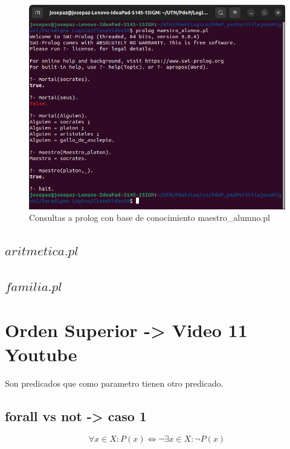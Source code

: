 \documentclass[11pt,a4paper]{article}
\begin{document}
\begin{figure}[H]
	\centering
	\includegraphics[scale=0.6]{figuras/maestro_alumno.png}
    \caption{Consultas a prolog con base de conocimiento maestro\_alumno.pl}
    \label{fig:maestro alumno}
\end{figure} 


\subsection{$aritmetica.pl$}
 

\subsection{$familia.pl$}
 


\newpage

\section{Orden Superior -> Video 11 Youtube}

Son predicados que como parametro tienen otro predicado.

\subsection{forall vs not -> caso 1}

\begin{equation}
	\forall x \in X: P(x) \iff \neg \exists x \in X: \neg P(x)
\end{equation}
\end{document}

